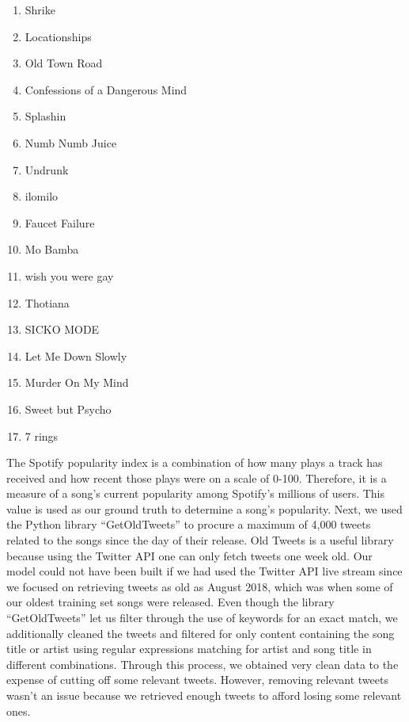 \documentclass[12pt,conference]{IEEEtran}
\begin{document}
\begin{enumerate}
    \item Shrike                          
    \item Locationships                   
    \item Old Town Road                   
    \item Confessions of a Dangerous Mind 
    \item Splashin                        
    \item Numb Numb Juice                 
    \item Undrunk                         
    \item ilomilo                         
    \item Faucet Failure                  
    \item Mo Bamba                        
    \item wish you were gay               
    \item Thotiana                        
    \item SICKO MODE                      
    \item Let Me Down Slowly              
    \item Murder On My Mind               
    \item Sweet but Psycho                
    \item 7 rings                         
\end{enumerate}

The Spotify popularity index is a combination of how many plays a track has received and how recent those plays were on a scale of 0-100. Therefore, it is a measure of a song's current popularity among Spotify's millions of users. This value is used as our ground truth to determine a song’s popularity. Next, we used the Python library ``GetOldTweets'' to procure a maximum of 4,000 tweets related to the songs since the day of their release. Old Tweets is a useful library because using the Twitter API one can only fetch tweets one week old. Our model could not have been built if we had used the Twitter API live stream since we focused on retrieving tweets as old as August 2018, which was when some of our oldest training set songs were released. Even though the library ``GetOldTweets'' let us filter through the use of keywords for an exact match, we additionally cleaned the tweets and filtered for only content containing the song title or artist using regular expressions matching for artist and song title in different combinations. Through this process, we obtained very clean data to the expense of cutting off some relevant tweets. However, removing relevant tweets wasn't an issue because we retrieved enough tweets to afford losing some relevant ones. \par
\end{document}
